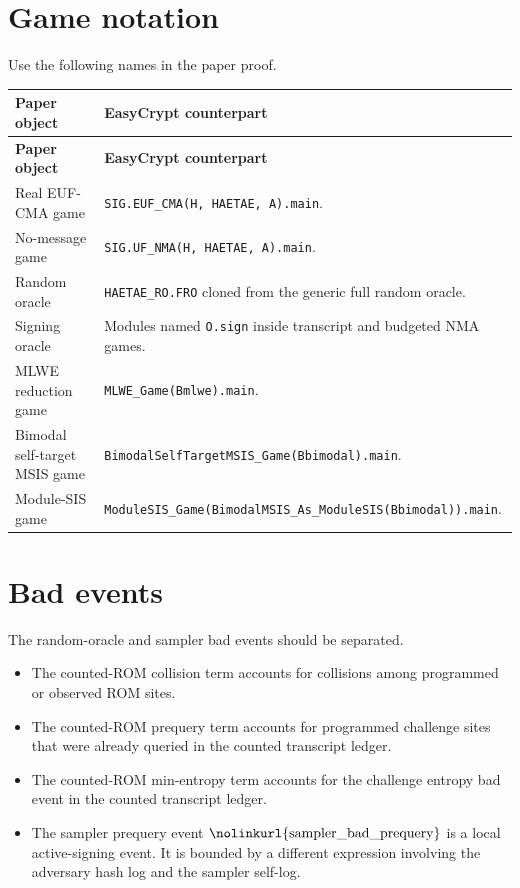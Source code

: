 \documentclass[11pt]{report}
\DeclareRobustCommand{\ec}[1]{\ifmmode\text{\nolinkurl{#1}}\else\nolinkurl{#1}\fi}
\theoremstyle{definition}
\theoremstyle{plain}
\begin{document}
\section{Game notation}

Use the following names in the paper proof.

\begin{longtable}{p{}p{}}
\toprule
\textbf{Paper object} & \textbf{EasyCrypt counterpart} \\
\midrule
\endfirsthead
\toprule
\textbf{Paper object} & \textbf{EasyCrypt counterpart} \\
\midrule
\endhead
Real EUF-CMA game &
\ec{SIG.EUF\_CMA(H, HAETAE, A).main}. \\
\midrule
No-message game &
\ec{SIG.UF\_NMA(H, HAETAE, A).main}. \\
\midrule
Random oracle &
\ec{HAETAE\_RO.FRO} cloned from the generic full random oracle. \\
\midrule
Signing oracle &
Modules named \ec{O.sign} inside transcript and budgeted NMA games. \\
\midrule
MLWE reduction game &
\ec{MLWE\_Game(Bmlwe).main}. \\
\midrule
Bimodal self-target MSIS game &
\ec{BimodalSelfTargetMSIS\_Game(Bbimodal).main}. \\
\midrule
Module-SIS game &
\ec{ModuleSIS\_Game(BimodalMSIS\_As\_ModuleSIS(Bbimodal)).main}. \\
\bottomrule
\end{longtable}

\section{Bad events}

The random-oracle and sampler bad events should be separated.

\begin{itemize}
\item The counted-ROM collision term accounts for collisions among programmed
or observed ROM sites.
\item The counted-ROM prequery term accounts for programmed challenge sites
that were already queried in the counted transcript ledger.
\item The counted-ROM min-entropy term accounts for the challenge entropy bad
event in the counted transcript ledger.
\item The sampler prequery event \(\ec{sampler\_bad\_prequery}\) is a local
active-signing event.  It is bounded by a different expression involving the
adversary hash log and the sampler self-log.
\end{itemize}
\end{document}
